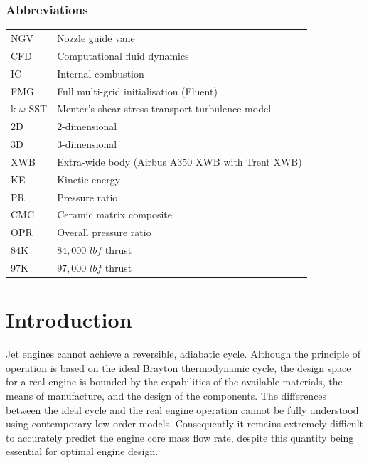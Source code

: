 \documentclass[a4paper, 11pt, oneside]{report}
\begin{document}
\subsection*{Abbreviations}
\begin{table}[H]
\begin{center}
\begin{tabular}{ll}
NGV & Nozzle guide vane \\
CFD & Computational fluid dynamics \\
IC & Internal combustion \\
FMG & Full multi-grid initialisation (Fluent) \\
k-$\omega$ SST & Menter's shear stress transport turbulence model \\
2D & 2-dimensional \\
3D & 3-dimensional \\
XWB & Extra-wide body (Airbus A350 XWB with Trent XWB) \\
KE & Kinetic energy \\
PR & Pressure ratio \\
CMC & Ceramic matrix composite \\
OPR & Overall pressure ratio \\
84K & $84,000$ $lbf$ thrust \\
97K & $97,000$ $lbf$ thrust
\end{tabular}
\end{center}
\end{table}



\chapter{Introduction}
\label{chapter_introduction}



Jet engines cannot achieve a reversible, adiabatic cycle. Although the principle of operation is based on the ideal Brayton thermodynamic cycle, the design space for a real engine is bounded by the capabilities of the available materials, the means of manufacture, and the design of the components. The differences between the ideal cycle and the real engine operation cannot be fully understood using contemporary low-order models. Consequently it remains extremely difficult to accurately predict the engine core mass flow rate, despite this quantity being essential for optimal engine design.
\end{document}
